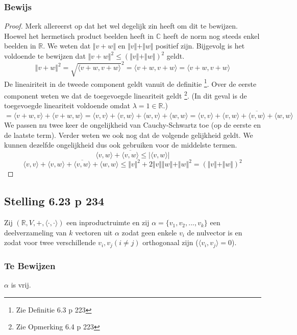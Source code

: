 \documentclass[lineaire_algebra_oplossingen.tex]{subfiles}
\begin{document}
\subsubsection*{Bewijs}
\begin{proof}
Merk allereerst op dat het wel degelijk zin heeft om dit te bewijzen. Hoewel het hermetisch product beelden heeft in $\mathbb{C}$ heeft de norm nog steeds enkel beelden in $\mathbb{R}$.
We weten dat $\Vert v+w \Vert$ en $\Vert v\Vert + \Vert w\Vert$ positief zijn. Bijgevolg is het voldoende te bewijzen dat $\Vert v+w \Vert^2 \le (\Vert v\Vert + \Vert w\Vert)^2$ geldt.
\[
 \Vert v+w \Vert^2 = \sqrt{\langle v+w,v+w\rangle}^2 = \langle v+w,v+w\rangle = \langle v+w,v+w\rangle
\]
De lineairiteit in de tweede component geldt vanuit de definitie \footnote{Zie Definitie 6.3 p 223}. Over de eerste component weten we dat de toegevoegde lineariteit geldt \footnote{Zie Opmerking 6.4 p 223}. (In dit geval is de toegevoegde lineariteit voldoende omdat $\lambda = 1 \in \mathbb{R}$.)
\[
= \langle v+w,v\rangle + \langle v+w,w\rangle = \langle v,v\rangle + \langle v,w\rangle + \langle w,v \rangle + \langle w,w \rangle = \langle v,v\rangle + \langle v,w\rangle + \overline{\langle v,w \rangle} + \langle w,w \rangle
\]
We passen nu twee keer de ongelijkheid van Cauchy-Schwartz toe (op de eerste en de laatste term). Verder weten we ook nog dat de volgende gelijkheid geldt. We kunnen dezelfde ongelijkheid dus ook gebruiken voor de middelste termen.
\[
\langle v,w\rangle + \overline{\langle v,w \rangle} \le \vert\langle v,w\rangle\vert
\]
\[
\langle v,v\rangle + \langle v,w\rangle + \overline{\langle v,w \rangle} + \langle w,w \rangle \le \Vert v\Vert^2 + 2\Vert v\Vert \Vert w\Vert + \Vert w\Vert^2 = (\Vert v\Vert + \Vert w\Vert)^2
\]

\end{proof}

\subsection{Stelling 6.23 p 234}
Zij $(\mathbb{R},V,+,\langle\cdot,\cdot\rangle)$ een inproductruimte en zij $\alpha = \{v_1,v_2,...,v_k\}$ een deelverzameling van $k$ vectoren uit $\alpha$ zodat geen enkele $v_i$ de nulvector is en zodat voor twee verschillende $v_i,v_j (i\neq j)$ orthogonaal zijn ($\langle v_i,v_j \rangle = 0$). 
\subsubsection*{Te Bewijzen}
$\alpha$ is vrij.
\end{document}
